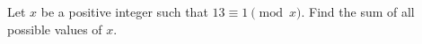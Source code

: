 Let $x$ be a positive integer such that $13\equiv1\pmod x$. Find the sum of all possible values of $x$.
